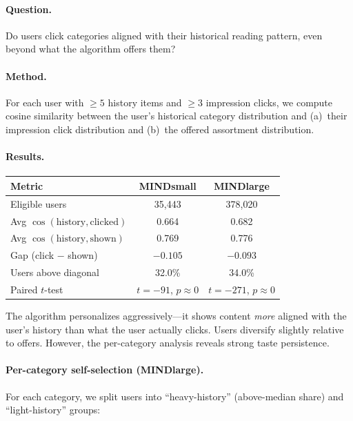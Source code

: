 \documentclass[11pt]{article}
\begin{document}
\paragraph{Question.} Do users click categories aligned with their historical reading pattern, even beyond what the algorithm offers them?

\paragraph{Method.} For each user with $\geq 5$ history items and $\geq 3$ impression clicks, we compute cosine similarity between the user's historical category distribution and (a)~their impression click distribution and (b)~the offered assortment distribution.

\paragraph{Results.}
\begin{center}
\begin{tabular}{lcc}
\toprule
Metric & MINDsmall & MINDlarge \\
\midrule
Eligible users & 35,443 & 378,020 \\
Avg $\cos(\text{history}, \text{clicked})$ & 0.664 & 0.682 \\
Avg $\cos(\text{history}, \text{shown})$ & 0.769 & 0.776 \\
Gap (click $-$ shown) & $-0.105$ & $-0.093$ \\
Users above diagonal & 32.0\% & 34.0\% \\
Paired $t$-test & $t = -91$, $p \approx 0$ & $t = -271$, $p \approx 0$ \\
\bottomrule
\end{tabular}
\end{center}

The algorithm personalizes aggressively---it shows content \emph{more} aligned with the user's history than what the user actually clicks. Users diversify slightly relative to offers. However, the per-category analysis reveals strong taste persistence.

\paragraph{Per-category self-selection (MINDlarge).} For each category, we split users into ``heavy-history'' (above-median share) and ``light-history'' groups:
\end{document}
